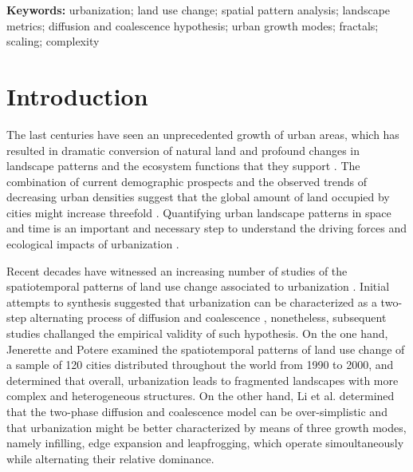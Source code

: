 \documentclass[10pt,letterpaper]{article}
\begin{document}
\textbf{Keywords:} urbanization; land use change; spatial pattern analysis; landscape metrics; diffusion and coalescence hypothesis; urban growth modes; fractals; scaling; complexity


\linenumbers

\section*{Introduction}

The last centuries have seen an unprecedented growth of urban areas, which has resulted in dramatic conversion of natural land and profound changes in landscape patterns and the ecosystem functions that they support \cite{alberti2005effects}. %
The combination of current demographic prospects and the observed trends of decreasing urban densities suggest that the global amount of land occupied by cities might increase threefold \cite{angel2005dynamics}.
Quantifying urban landscape patterns in space and time is an important and necessary step to understand the driving forces and ecological impacts of urbanization \cite{wu2014urban}. 

Recent decades have witnessed an increasing number of studies of the spatiotemporal patterns of land use change associated to urbanization \cite{dietzel2005spatio, seto2005quantifying, schneider2008compact, jenerette2010global, wu2011quantifying, li2013quantifying, liu2016general, nong2018quantifying}.
Initial attempts to synthesis suggested that urbanization can be characterized as a two-step alternating process of diffusion and coalescence \cite{dietzel2005spatio, schneider2008compact}, nonetheless, subsequent studies challanged the empirical validity of such hypothesis.
On the one hand, Jenerette and Potere \cite{jenerette2010global} examined the spatiotemporal patterns of land use change of a sample of 120 cities distributed throughout the world from 1990 to 2000, and determined that overall, urbanization leads to fragmented landscapes with more complex and heterogeneous structures. On the other hand, Li et al. \cite{li2013quantifying} determined that the two-phase diffusion and coalescence model can be over-simplistic and that urbanization might be better characterized by means of three growth modes, namely infilling, edge expansion and leapfrogging, which operate simoultaneously while alternating their relative dominance.
\end{document}
